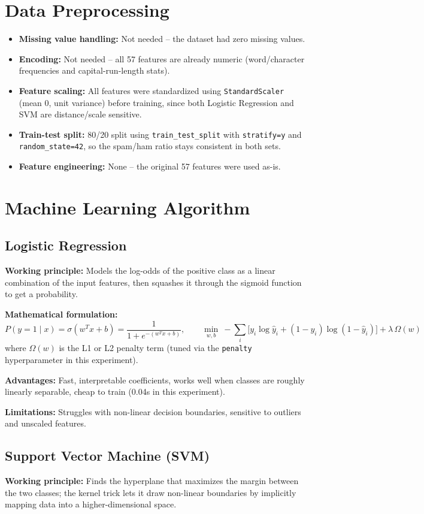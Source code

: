 \documentclass[12pt,a4paper]{article}
\begin{document}
\section{Data Preprocessing}
\begin{itemize}
\item \textbf{Missing value handling:} Not needed -- the dataset had zero missing values.
\item \textbf{Encoding:} Not needed -- all 57 features are already numeric (word/character frequencies and capital-run-length stats).
\item \textbf{Feature scaling:} All features were standardized using \texttt{StandardScaler} (mean 0, unit variance) before training, since both Logistic Regression and SVM are distance/scale sensitive.
\item \textbf{Train-test split:} 80/20 split using \texttt{train\_test\_split} with \texttt{stratify=y} and \texttt{random\_state=42}, so the spam/ham ratio stays consistent in both sets.
\item \textbf{Feature engineering:} None -- the original 57 features were used as-is.
\end{itemize}

\section{Machine Learning Algorithm}
\subsection*{Logistic Regression}
\textbf{Working principle:} Models the log-odds of the positive class as a linear combination of the input features, then squashes it through the sigmoid function to get a probability.

\textbf{Mathematical formulation:}
\[
P(y=1\mid x) = \sigma(w^Tx + b) = \frac{1}{1+e^{-(w^Tx+b)}}, \qquad
\min_{w,b}\ -\sum_i \big[y_i\log \hat{y}_i + (1-y_i)\log(1-\hat{y}_i)\big] + \lambda \, \Omega(w)
\]
where $\Omega(w)$ is the L1 or L2 penalty term (tuned via the \texttt{penalty} hyperparameter in this experiment).

\textbf{Advantages:} Fast, interpretable coefficients, works well when classes are roughly linearly separable, cheap to train (0.04s in this experiment).

\textbf{Limitations:} Struggles with non-linear decision boundaries, sensitive to outliers and unscaled features.

\subsection*{Support Vector Machine (SVM)}
\textbf{Working principle:} Finds the hyperplane that maximizes the margin between the two classes; the kernel trick lets it draw non-linear boundaries by implicitly mapping data into a higher-dimensional space.
\end{document}
